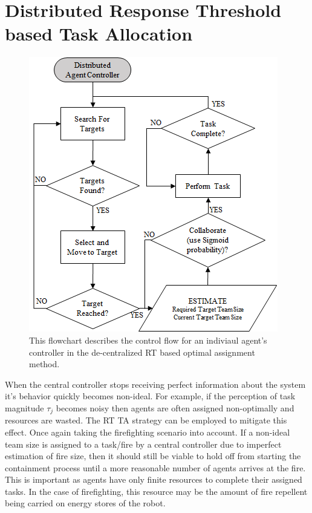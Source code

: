 \documentclass[defaultstyle,12pt]{thesis}
\begin{document}
\section{Distributed Response Threshold based Task Allocation}
\begin{figure}[!ht]
\centering\includegraphics[width=.5\columnwidth]{../assets/DistributedController.png}
\centering\caption{This flowchart describes the control flow for an indiviaul agent's controller in the de-centralized RT based optimal assignment method.}\label{fig:distcontrol}
\end{figure}
When the central controller stops receiving perfect information about the system it's behavior 
quickly becomes non-ideal. For example, if the perception of task magnitude $\tau_j$ becomes noisy then agents are often assigned non-optimally and resources are wasted. The RT TA strategy can be employed to mitigate this effect. Once again taking the firefighting scenario into account. If a non-ideal team size is assigned to a task/fire by a central controller due to imperfect estimation of fire size, then it should still be viable to hold off from starting the containment process until a more reasonable number of agents arrives at the fire. This is important as agents have only finite resources to complete their assigned tasks. In the case of firefighting, this resource may be the amount of fire repellent being carried on energy stores of the robot.
\end{document}
